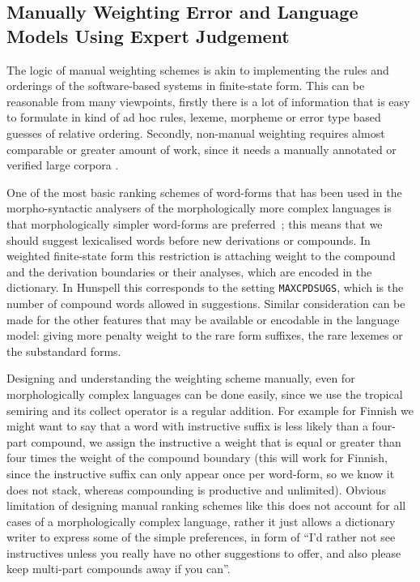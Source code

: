 \documentclass[a4paper,12pt]{article}
\begin{document}
\subsection{Manually Weighting Error and Language Models Using Expert
Judgement}
\label{subsec:manual-weighting}

The logic of manual weighting schemes is akin to implementing the rules and
orderings of the software-based systems in finite-state form. This can be
reasonable from many viewpoints, firstly there is a lot of information that
is easy to formulate in kind of ad hoc rules, lexeme, morpheme or error
type based guesses of relative ordering. Secondly, non-manual weighting
requires almost comparable or greater amount of work, since it needs a
manually annotated or verified large corpora .

One of the most basic ranking schemes of word-forms that has been used in the
morpho-syntactic analysers of the morphologically more complex languages is
that morphologically simpler word-forms are
preferred~\cite[]{karlsson1992swetwol}; this means that we should suggest
lexicalised words before new derivations or compounds.  In weighted
finite-state form this restriction is attaching weight to the compound and the
derivation boundaries or their analyses, which are encoded in the dictionary.
In Hunspell this corresponds to the setting \texttt{MAXCPDSUGS}, which is
the number of compound words allowed in suggestions. Similar
consideration can be made for the other features that may be available or
encodable in the language model: giving more penalty weight to the rare form
suffixes, the rare lexemes or the substandard forms.

Designing and understanding the weighting scheme manually, even for
morphologically complex languages can be done easily, since we use the tropical
semiring and its collect operator is a regular addition. For example for
Finnish we might want to say that a word with instructive suffix is less likely
than a four-part compound, we assign the instructive a weight that is equal or
greater than four times the weight of the compound boundary (this will work for
Finnish, since the instructive suffix can only appear once per word-form, so we
know it does not stack, whereas compounding is productive and unlimited).
Obvious limitation of designing manual ranking schemes like this does not
account for all cases of a morphologically complex language, rather it just
allows a dictionary writer to express some of the simple preferences, in form
of ``I'd rather not see instructives unless you really have no other
suggestions to offer, and also please keep multi-part compounds away if you
can''.
\end{document}
